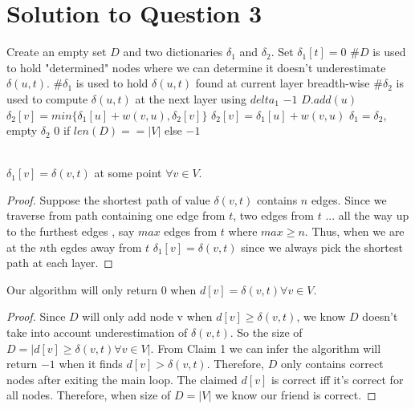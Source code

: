 \documentclass[11pt]{article}
\begin{document}
\newpage
\section{Solution to Question 3}


\begin{algorithm}
	\begin{algorithmic}
		\State Create an empty set $D$ and two dictionaries $\delta_1$ and $\delta_2$. Set $\delta_1[t] = 0$
		\State \#$D$ is used to hold "determined" nodes where we can determine it doesn't underestimate $\delta(u, t)$.
		\State \#$\delta_1$ is used to hold $\delta(u, t)$ found at current layer breadth-wise
		\State \#$\delta_2$ is used to compute $\delta(u, t)$ at the next layer using $delta_1$
				\State \Return $-1$
				\State $D.add(u)$
			\EndIf
					\State $\delta_2[v] = min\{\delta_1[u] + w(v, u), \delta_2[v]\}$
				\Else
					\State $\delta_2[v] = \delta_1[u] + w(v, u)$
				\EndIf
			\EndFor
				\State $\delta_1 = \delta_2$, empty $\delta_2$
			\EndIf
		\EndFor
		\State \Return $0$ if $len(D) == |V|$ else $-1$
	\end{algorithmic}
\end{algorithm}

\\

 $\delta_1[v] = \delta(v, t)$ at some point $\forall v \in V$.

\begin{proof}
	
Suppose the shortest path of value $\delta(v, t)$ contains $n$ edges. Since we traverse from path containing one edge from $t$, two edges from $t$ ... all the way up to the furthest edges , say $max$ edges from $t$ where $max \geq n$. Thus, when we are at the $n$th egdes away from $t$ $\delta_1[v] = \delta(v, t)$ since we always pick the shortest path at each layer.	

\end{proof}

 Our algorithm will only return $0$ when $d[v] = \delta(v, t) \forall v \in V$.

\begin{proof}
	
Since $D$ will only add node v when $d[v] \geq \delta(v, t)$, we know $D$ doesn't take into account underestimation of $\delta(v, t)$. So the size of $D = |d[v] \geq \delta(v, t) \forall v \in V|$. From Claim 1 we can infer the algorithm will return $-1$ when it finds $d[v] > \delta(v, t)$. Therefore, $D$ only contains correct nodes after exiting the main loop. The claimed $d[v]$ is correct iff it's correct for all nodes. Therefore, when size of $D = |V|$ we know our friend is correct.

\end{proof}
\end{document}
